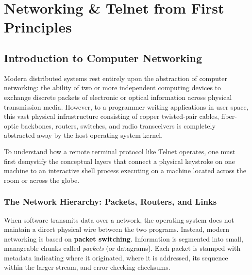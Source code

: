 \chapter{Networking \& Telnet from First Principles}
\label{chap:fundamentals}

\section{Introduction to Computer Networking}

Modern distributed systems rest entirely upon the abstraction of computer networking: the ability of two or more independent computing devices to exchange discrete packets of electronic or optical information across physical transmission media. However, to a programmer writing applications in user space, this vast physical infrastructure consisting of copper twisted-pair cables, fiber-optic backbones, routers, switches, and radio transceivers is completely abstracted away by the host operating system kernel.

To understand how a remote terminal protocol like Telnet operates, one must first demystify the conceptual layers that connect a physical keystroke on one machine to an interactive shell process executing on a machine located across the room or across the globe.

\subsection{The Network Hierarchy: Packets, Routers, and Links}

When software transmits data over a network, the operating system does not maintain a direct physical wire between the two programs. Instead, modern networking is based on \textbf{packet switching}. Information is segmented into small, manageable chunks called \textit{packets} (or datagrams). Each packet is stamped with metadata indicating where it originated, where it is addressed, its sequence within the larger stream, and error-checking checksums.

